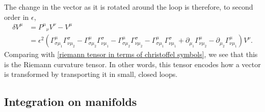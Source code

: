 The change in the vector as it is rotated around the loop is therefore, to second order in $\epsilon$,
%
\begin{align}
    \delta V^\mu 
    &= P^\mu{}_\nu V^\nu - V^\mu \\ \nonumber
    & = \epsilon^2  
    \left(
        \Gamma^\mu_{\sigma \mu_1} \Gamma^\sigma_{\nu \mu_2}
        -\Gamma^\mu_{\sigma \mu_2} \Gamma^\sigma_{\nu \mu_1}
        -\Gamma^\mu_{\sigma \mu_2} \Gamma^\sigma_{\nu \mu_2} 
        -\Gamma^\mu_{\sigma \mu_1} \Gamma^\sigma_{\nu \mu_1}
        + \partial_{\mu_1} \Gamma^{\mu}_{\nu \mu_2}
        - \partial_{\mu_2} \Gamma^{\mu}_{\nu \mu_1} 
    \right) V^\nu.
\end{align}
Comparing with \autoref{riemann tensor in terms of christoffel symbols}, we see that this is the Riemann curvature tensor.
In other words, this tensor encodes how a vector is transformed by transporting it in small, closed loops.



\subsection{Integration on manifolds}
\label{subsection: integration on manifolds}

